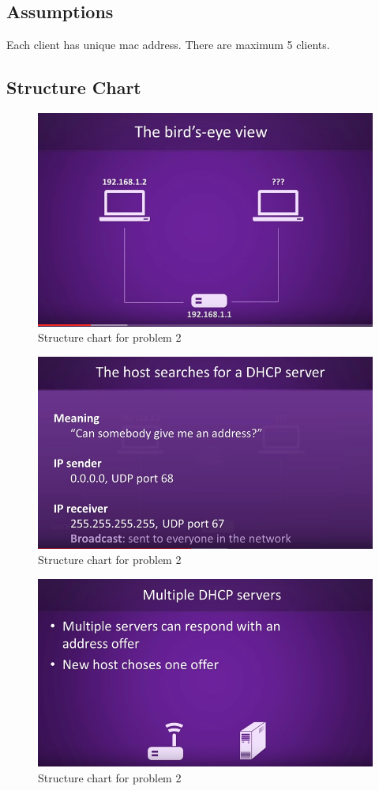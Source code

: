 \documentclass[11pt]{report}
\begin{document}
\subsection{Assumptions}
Each client has unique mac address. There are maximum 5 clients.
\pagebreak
\subsection{Structure Chart}
	\begin{figure}[h!]
	\centering
	\includegraphics[scale=0.7]{images/sc21}
	\caption{Structure chart for problem 2  }	
	\end{figure}
	\pagebreak
	\begin{figure}[h!]
	\centering
	\includegraphics[scale=0.7]{images/sc22}
	\caption{Structure chart for problem 2 }	
	\end{figure}
	\pagebreak
	\begin{figure}[h!]
	\centering
	\includegraphics[scale=0.7]{images/sc23}
	\caption{Structure chart for problem 2 }	
	\end{figure}
\end{document}
